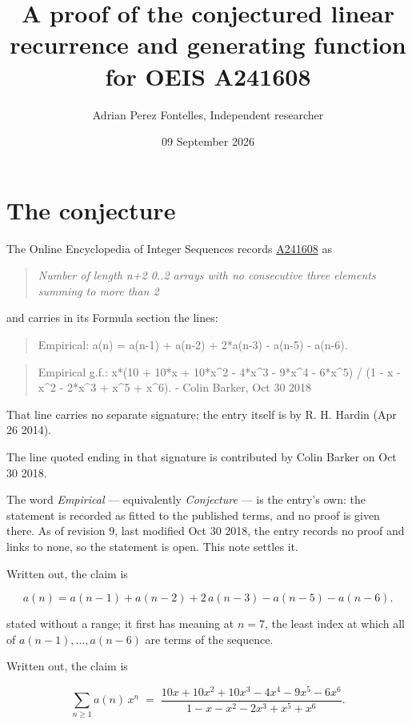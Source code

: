 \documentclass[11pt]{article}
\title{A proof of the conjectured linear recurrence and generating function for OEIS A241608}
\author{Adrian Perez Fontelles, Independent researcher}
\date{09 September 2026}
\theoremstyle{definition}
\begin{document}
\maketitle
\section{The conjecture}

The Online Encyclopedia of Integer Sequences records \href{https://oeis.org/A241608}{A241608} as

\begin{quote}\itshape Number of length n+2 0..2 arrays with no consecutive three elements summing to more than 2\end{quote}

and carries in its Formula section the lines:

\begin{quote}\ttfamily Empirical: a(n) = a(n-1) + a(n-2) + 2*a(n-3) - a(n-5) - a(n-6).\end{quote}

\begin{quote}\ttfamily Empirical g.f.: x*(10 + 10*x + 10*x\textasciicircum{}2 - 4*x\textasciicircum{}3 - 9*x\textasciicircum{}4 - 6*x\textasciicircum{}5) / (1 - x - x\textasciicircum{}2 - 2*x\textasciicircum{}3 + x\textasciicircum{}5 + x\textasciicircum{}6). - Colin Barker, Oct 30 2018\end{quote}

That line carries no separate signature; the entry itself is by R. H. Hardin (Apr 26 2014).

The line quoted ending in that signature is contributed by Colin Barker on Oct 30 2018.

The word {\itshape Empirical} --- equivalently {\itshape Conjecture} --- is the entry's own: the statement is recorded as fitted to the published terms, and no proof is given there. As of revision 9, last modified Oct 30 2018, the entry records no proof and links to none, so the statement is open. This note settles it.

Written out, the claim is

\[a(n) = a(n-1) + a(n-2) + 2\,a(n-3) - a(n-5) - a(n-6).\]

stated without a range; it first has meaning at $n = 7$, the least index at which all of $a(n-1),\dots,a(n-6)$ are terms of the sequence.

Written out, the claim is

\[\sum_{n \ge 1} a(n)\,x^n \;=\; \frac{10x + 10x^{2} + 10x^{3} - 4x^{4} - 9x^{5} - 6x^{6}}{1 - x - x^{2} - 2x^{3} + x^{5} + x^{6}}.\]
\end{document}
